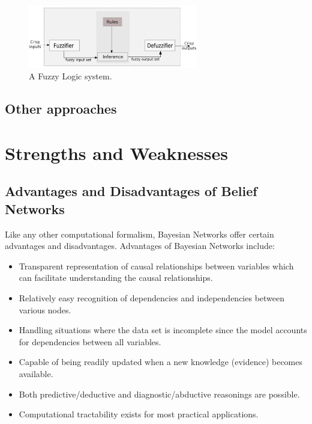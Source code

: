 \documentclass[11pt]{article}
\begin{document}
\begin{figure}[tbh]
  \center
  \includegraphics[width=0.66\textwidth]{figure/fuzzy-system.png}
  \caption{A Fuzzy Logic system.}
  \label{fig:fuzzy-system}
\end{figure}

\subsection{Other approaches}

\section{Strengths and Weaknesses}

\subsection{Advantages and Disadvantages of Belief Networks}

Like any other computational formalism, Bayesian Networks offer certain
advantages and disadvantages. Advantages of Bayesian Networks include:

\begin{itemize}
  \item Transparent representation of causal relationships between variables
  which can facilitate understanding the causal relationships.
  
  \item Relatively easy recognition of dependencies and independencies between
  various nodes.
  
  \item Handling situations where the data set is incomplete since the model
  accounts for dependencies between all variables.
  
  \item Capable of being readily updated when a new knowledge (evidence) becomes
  available.
  
  \item Both predictive/deductive and diagnostic/abductive reasonings are
  possible.

  \item Computational tractability exists for most practical applications.
\end{itemize}
\end{document}
